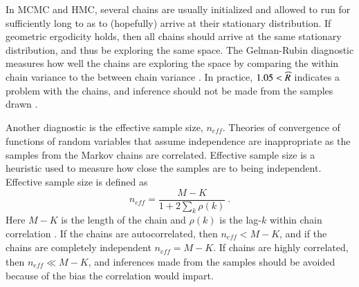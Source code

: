 In MCMC and HMC, several chains are usually initialized and allowed to run for sufficiently long to as to (hopefully) arrive at their stationary distribution.  If geometric ergodicity holds, then all chains should arrive at the same stationary distribution, and thus be exploring the same space.  The Gelman-Rubin diagnostic  measures how well the chains are exploring the space by comparing the within chain variance to the between chain variance \cite{gelman2013bayesian}.  In practice, $ 1.05<\widehat{R} $ indicates a problem with the chains, and inference should not be made from the samples drawn \cite{betancourt2017robust}.

Another diagnostic is the effective sample size, $ n_{\mathit{eff}} $.  Theories of convergence of functions of random variables that assume independence are inappropriate as the samples from the Markov chains are correlated.  Effective sample size is a heuristic used to measure how close the samples are to being independent.  Effective sample size is defined as
%
\[ n_{\mathit{eff}} = \dfrac{M-K}{1+ 2\displaystyle\sum_k \rho(k)} \>. \]
%
Here $ M-K $ is the length of the chain and $ \rho(k) $ is the lag-$k$ within chain correlation \cite{gelman2013bayesian,kass1998markov}.  If the chains are autocorrelated, then $n_{\mathit{eff}} <M-K$, and if the chains are completely independent $n_{\mathit{eff}} = M-K$. If chains are highly correlated, then $n_{\mathit{eff}} \ll M-K$, and inferences made from the samples should be avoided because of the bias the correlation would impart.